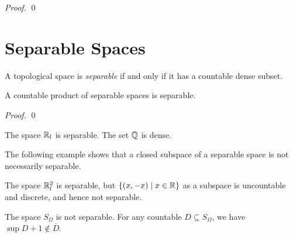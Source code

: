 \begin{proof}
    \pf
    \qed
\end{proof}

\section{Separable Spaces}

\begin{definition}[Separable]
    A topological space is \emph{separable} if and only if it has a countable dense
    subset.
\end{definition}

\begin{proposition}[AC]
    A countable product of separable spaces is separable.
\end{proposition}

\begin{proof}
    \pf
    \qed
\end{proof}

\begin{example}
    The space $\mathbb{R}_l$ is separable. The set $\mathbb{Q}$ is dense.
\end{example}

The following example shows that a closed subspace of a separable space is not
necessarily separable.
\begin{example}[AC]
    The space $\mathbb{R}_l^2$ is separable, but $\{ (x, -x) \mid x \in \mathbb{R} \}$ as a
    subspace is uncountable and discrete, and hence not separable.
\end{example}

\begin{example}
    The space $S_\Omega$ is not separable. For any countable $D \subseteq S_\Omega$,
    we have $\sup D + 1 \notin \overline{D}$.
\end{example}


